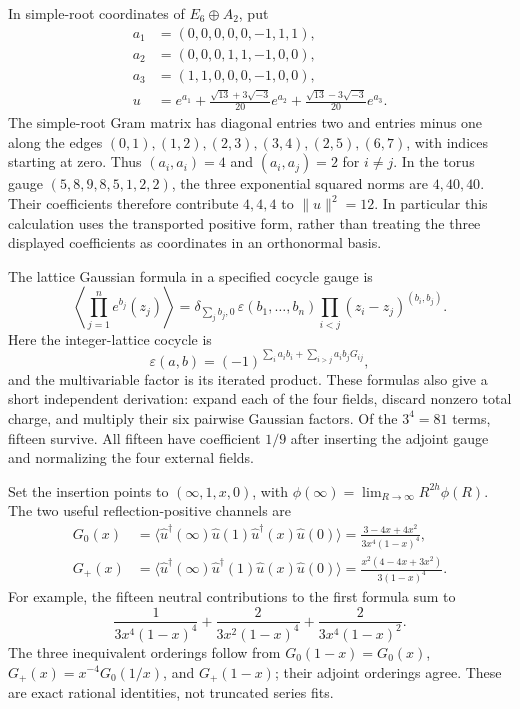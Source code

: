 In simple-root coordinates of $E_6\oplus A_2$, put
\begin{align}
 a_1&=(0,0,0,0,0,-1,1,1),\\
 a_2&=(0,0,0,1,1,-1,0,0),\\
 a_3&=(1,1,0,0,0,-1,0,0),\\
 u&=e^{a_1}+\frac{\sqrt{13}+3\sqrt{-3}}{20}e^{a_2}
             +\frac{\sqrt{13}-3\sqrt{-3}}{20}e^{a_3}.
\end{align}
The simple-root Gram matrix has diagonal entries two and entries minus
one along the edges $(0,1),(1,2),(2,3),(3,4),(2,5),(6,7)$, with indices
starting at zero.  Thus $(a_i,a_i)=4$ and $(a_i,a_j)=2$ for $i\ne j$.
In the torus gauge $(5,8,9,8,5,1,2,2)$, the three exponential squared
norms are $4,40,40$.  Their coefficients therefore contribute $4,4,4$
to $\|u\|^2=12$.  In particular this calculation uses the transported
positive form, rather than treating the three displayed coefficients as
coordinates in an orthonormal basis.

The lattice Gaussian formula in a specified cocycle gauge is
\begin{equation}
 \left\langle\prod_{j=1}^{n}e^{b_j}(z_j)\right\rangle
 =\delta_{\sum_j b_j,0}\,
   \varepsilon(b_1,\ldots,b_n)
   \prod_{i<j}(z_i-z_j)^{(b_i,b_j)}.
\end{equation}
Here the integer-lattice cocycle is
\begin{equation}
 \varepsilon(a,b)=(-1)^{\sum_i a_i b_i+
                  \sum_{i>j}a_i b_jG_{ij}},
\end{equation}
and the multivariable factor is its iterated product.  These formulas
also give a short independent derivation: expand each of the four
fields, discard nonzero total charge, and multiply their six pairwise
Gaussian factors.  Of the $3^4=81$ terms, fifteen survive.  All fifteen
have coefficient $1/9$ after inserting the adjoint gauge and normalizing
the four external fields.

Set the insertion points to $(\infty,1,x,0)$, with
$\phi(\infty)=\lim_{R\to\infty}R^{2h}\phi(R)$.  The two useful
reflection-positive channels are
\begin{align}
 G_0(x)&=\langle\widehat u^\dagger(\infty)\widehat u(1)
                 \widehat u^\dagger(x)\widehat u(0)\rangle
       =\boxed{\frac{3-4x+4x^2}{3x^4(1-x)^4}},
       \label{eq:physics-u-neutral}\\
 G_+(x)&=\langle\widehat u^\dagger(\infty)\widehat u^\dagger(1)
                 \widehat u(x)\widehat u(0)\rangle
       =\boxed{\frac{x^2(4-4x+3x^2)}{3(1-x)^4}}.
       \label{eq:physics-u-charged}
\end{align}
For example, the fifteen neutral contributions to the first formula
sum to
\begin{equation}
 \frac{1}{3x^4(1-x)^4}
 +\frac{2}{3x^2(1-x)^4}
 +\frac{2}{3x^4(1-x)^2}.
\end{equation}
The three inequivalent orderings follow from
$G_0(1-x)=G_0(x)$,
$G_+(x)=x^{-4}G_0(1/x)$, and $G_+(1-x)$; their adjoint orderings agree.
These are exact rational identities, not truncated series fits.

